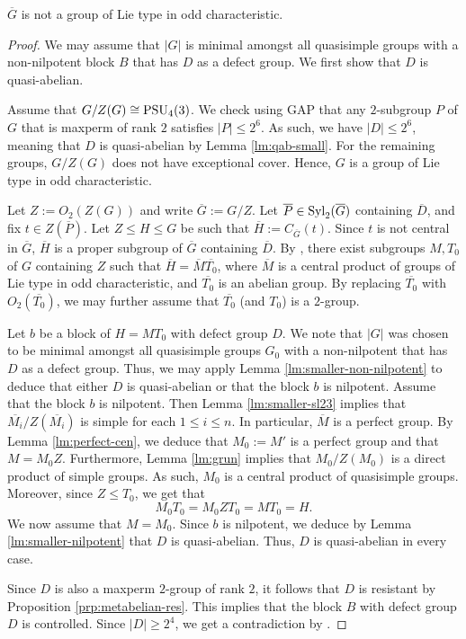 \documentclass[bysection, amsart]{standard}
\begin{document}
\begin{lemma}
    $\overline{G}$ is not a group of Lie type in odd characteristic.
\end{lemma}
\begin{proof}
    We may assume that $|G|$ is minimal amongst all quasisimple groups with a non-nilpotent block $B$ that has $D$ as a defect group. We first show that $D$ is quasi-abelian. 
    
    Assume that $G/Z(G) \cong \operatorname{PSU}_4(3)$. We check using GAP \cite{GAP4} that any $2$-subgroup $P$ of $G$ that is maxperm of rank $2$ satisfies $|P| \leq 2^6$. As such, we have $|D| \leq 2^6$, meaning that $D$ is quasi-abelian by Lemma \ref{lm:qab-small}. For the remaining groups, $G/Z(G)$ does not have exceptional cover. Hence, $G$ is a group of Lie type in odd characteristic.
    
    Let $Z := O_2(Z(G))$ and write $\overline{G} := G/Z$. Let $\overline{P} \in \operatorname{Syl}_2(\overline{G})$ containing $\overline{D}$, and fix $t \in Z(\overline{P})$. Let $Z \leq H \leq G$ be such that $\overline{H} := C_{\overline{G}}(t)$. Since $t$ is not central in $\overline{G}$, $\overline{H}$ is a proper subgroup of $\overline{G}$ containing $\overline{D}$. By \cite[Theorem 4.2.2]{book:gls3}, there exist subgroups $M, T_0$ of $G$ containing $Z$ such that $\overline{H} = \overline{M} \overline{T_0}$, where $\overline{M}$ is a central product of groups of Lie type in odd characteristic, and $\overline{T_0}$ is an abelian group. By replacing $\overline{T_0}$ with $O_2(\overline{T_0})$, we may further assume that $\overline{T_0}$ (and $T_0$) is a $2$-group. 

    Let $b$ be a block of $H = MT_0$ with defect group $D$. We note that $|G|$ was chosen to be minimal amongst all quasisimple groups $G_0$ with a non-nilpotent that has $D$ as a defect group. Thus, we may apply Lemma \ref{lm:smaller-non-nilpotent} to deduce that either $D$ is quasi-abelian or that the block $b$ is nilpotent. Assume that the block $b$ is nilpotent. Then Lemma \ref{lm:smaller-sl23} implies that $\overline{M_i}/Z(\overline{M_i})$ is simple for each $1 \leq i \leq n$. In particular, $\overline{M}$ is a perfect group. By Lemma \ref{lm:perfect-cen}, we deduce that $M_0 := M'$ is a perfect group and that $M = M_0 Z$. Furthermore, Lemma \ref{lm:grun} implies that $M_0/Z(M_0)$ is a direct product of simple groups. As such, $M_0$ is a central product of quasisimple groups. Moreover, since $Z \leq T_0$, we get that 
    \[M_0 T_0 = M_0 ZT_0 = MT_0 = H.\]
    We now assume that $M = M_0$. Since $b$ is nilpotent, we deduce by Lemma \ref{lm:smaller-nilpotent} that $D$ is quasi-abelian. Thus, $D$ is quasi-abelian in every case.

    Since $D$ is also a maxperm $2$-group of rank $2$, it follows that $D$ is resistant by Proposition \ref{prp:metabelian-res}. This implies that the block $B$ with defect group $D$ is controlled. Since $|D| \geq 2^4$, we get a contradiction by \cite[Theorem 1.1]{paper:j-an-controlled-2block}.
\end{proof}
\end{document}
